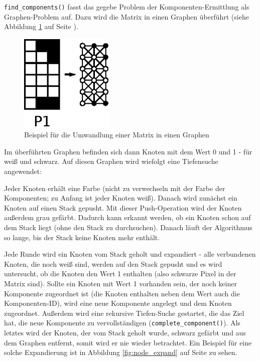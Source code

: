 \verb+find_components()+ fasst das gegebe Problem der Komponenten-Ermittlung als Graphen-Problem auf. Dazu wird die Matrix in einen Graphen überführt (siehe Abbildung \ref{fig:matrix_graph} auf Seite \pageref{fig:matrix_graph}).

\begin{figure}[tbhp]
	\centering
	\includegraphics[width=0.4\textwidth]{images/matrix_graph.eps}
	\caption{Beispiel für die Umwandlung einer Matrix in einen Graphen}
	\label{fig:matrix_graph}
\end{figure}

Im überführten Graphen befinden sich dann Knoten mit dem Wert 0 und 1 - für weiß und schwarz. Auf diesen Graphen wird wiefolgt eine Tiefensuche angewendet:

Jeder Knoten erhält eine Farbe (nicht zu verwechseln mit der Farbe der Komponenten; zu Anfang ist jeder Knoten weiß). Danach wird zunächst ein Knoten auf einen Stack gepusht. Mit dieser Push-Operation wird der Knoten außerdem grau gefärbt. Dadurch kann erkannt werden, ob ein Knoten schon auf dem Stack liegt (ohne den Stack zu durchsuchen). Danach läuft der Algorithmus so lange, bis der Stack keine Knoten mehr enthält.

Jede Runde wird ein Knoten vom Stack geholt und expandiert - alle verbundenen Knoten, die noch weiß sind, werden auf den Stack gepusht und es wird untersucht, ob die Knoten den Wert 1 enthalten (also schwarze Pixel in der Matrix sind). Sollte ein Knoten mit Wert 1 vorhanden sein, der noch keiner Komponente zugeordnet ist (die Knoten enthalten neben dem Wert auch die Komponenten-ID), wird eine neue Komponente angelegt und dem Knoten zugeordnet. Außerdem wird eine rekursive Tiefen-Suche gestartet, die das Ziel hat, die neue Komponente zu vervollständigen (\verb+complete_component()+). Als letztes wird der Knoten, der vom Stack geholt wurde, schwarz gefärbt und aus dem Graphen entfernt, somit wird er nie wieder betrachtet. Ein Beispiel für eine solche Expandierung ist in Abbildung \ref{fig:node_expand} auf Seite \pageref{fig:node_expand} zu sehen.

